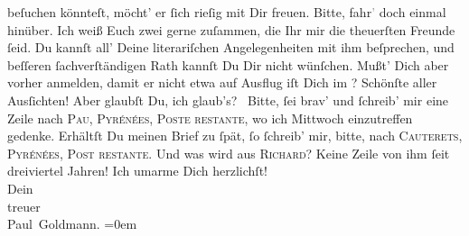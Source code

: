 \begin{ledgroupsized}[t]{13cm}
               beſuchen könnteſt, möcht’ er ſich rieſig mit Dir freuen. Bitte,
                  fahr\textcolor{gray}{’} doch einmal hinüber. Ich weiß Euch zwei gerne zuſammen,
               die Ihr mir die theuerſten Freunde ſeid. Du kannſt all’ Deine literariſchen Angelegenheiten mit ihm
               beſprechen, und beſſeren ſachverſtändigen Rath kannſt Du Dir {\pb}nicht wünſchen. Mußt’ Dich aber vorher anmelden,
               damit er nicht etwa auf Ausflug iſt{\dotsfour}\pend
           \pstart
           Dich im \label{K_L02701-4v}\label{K_L02701-4h}? Schönſte aller Ausſichten! Aber
               glaubſt Du, ich glaub’s? {\dotsfour}\pend
           \pstart
           Bitte, ſei brav’ und ſchreib’ mir eine Zeile nach \textsc{Pau}, \textsc{Pyrénées}, \textsc{Poste restante}, wo ich Mittwoch einzutreffen gedenke. Erhältſt Du {\pb}meinen Brief zu ſpät, ſo ſchreib’ mir, bitte, nach
                  \textsc{Cauterets}, \textsc{}{ }\textsc{Pyrénées}, \textsc{Post restante}.\pend
           \pstart
           Und was wird aus \textsc{Richard}? Keine Zeile von ihm ſeit dreiviertel Jahren!\pend
           \pstart
           Ich umarme Dich herzlichſt! {\\[\baselineskip]}Dein {\\[\baselineskip]}treuer {\\[\baselineskip]}\spacefill\mbox{Paul Goldmann.}\pend
           \leftskip=0em{}
         
         \endnumbering{}\end{ledgroupsized}  \newcommand{\dateiname}{L02701}\newcommand{\titel}{Paul Goldmann an Arthur Schnitzler, 5. 8. [1892]}\newcommand{\editorInnen}{Martin Anton Müller und Laura Untner}
      